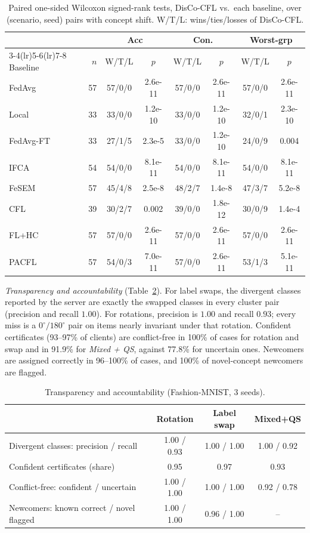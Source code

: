 \documentclass[journal]{IEEEtran}
\theoremstyle{definition}
\begin{document}
\begin{table}[t]
\centering
\caption{Paired one-sided Wilcoxon signed-rank tests, DisCo-CFL vs.\ each baseline, over (scenario, seed) pairs with concept shift. W/T/L: wins/ties/losses of DisCo-CFL.}\label{tab:signif}
\scriptsize\setlength{\tabcolsep}{2.2pt}
\begin{tabular}{lrcccccc}
\toprule
& & \multicolumn{2}{c}{Acc} & \multicolumn{2}{c}{Con.} & \multicolumn{2}{c}{Worst-grp} \\
\cmidrule(lr){3-4}\cmidrule(lr){5-6}\cmidrule(lr){7-8}
Baseline & $n$ & W/T/L & $p$ & W/T/L & $p$ & W/T/L & $p$ \\
\midrule
FedAvg & 57 & 57/0/0 & 2.6e-11 & 57/0/0 & 2.6e-11 & 57/0/0 & 2.6e-11 \\
Local & 33 & 33/0/0 & 1.2e-10 & 33/0/0 & 1.2e-10 & 32/0/1 & 2.3e-10 \\
FedAvg-FT & 33 & 27/1/5 & 2.3e-5 & 33/0/0 & 1.2e-10 & 24/0/9 & 0.004 \\
IFCA & 54 & 54/0/0 & 8.1e-11 & 54/0/0 & 8.1e-11 & 54/0/0 & 8.1e-11 \\
FeSEM & 57 & 45/4/8 & 2.5e-8 & 48/2/7 & 1.4e-8 & 47/3/7 & 5.2e-8 \\
CFL & 39 & 30/2/7 & 0.002 & 39/0/0 & 1.8e-12 & 30/0/9 & 1.4e-4 \\
FL+HC & 57 & 57/0/0 & 2.6e-11 & 57/0/0 & 2.6e-11 & 57/0/0 & 2.6e-11 \\
PACFL & 57 & 54/0/3 & 7.0e-11 & 57/0/0 & 2.6e-11 & 53/1/3 & 5.1e-11 \\
\bottomrule
\end{tabular}
\end{table}

\emph{Transparency and accountability} (Table~\ref{tab:fat}). For label swaps, the divergent classes reported by the server are exactly the swapped classes in every cluster pair (precision and recall $1.00$). For rotations, precision is $1.00$ and recall $0.93$; every miss is a $0^\circ/180^\circ$ pair on items nearly invariant under that rotation. Confident certificates (93--97\% of clients) are conflict-free in 100\% of cases for rotation and swap and in 91.9\% for \emph{Mixed + QS}, against 77.8\% for uncertain ones. Newcomers are assigned correctly in 96--100\% of cases, and 100\% of novel-concept newcomers are flagged.

\begin{table}[t]
\centering
\caption{Transparency and accountability (Fashion-MNIST, 3 seeds).}\label{tab:fat}
\scriptsize\setlength{\tabcolsep}{3pt}
\begin{tabular}{lccc}
\toprule
& Rotation & Label swap & Mixed+QS \\
\midrule
Divergent classes: precision / recall & 1.00 / 0.93 & 1.00 / 1.00 & 1.00 / 0.92 \\
Confident certificates (share) & 0.95 & 0.97 & 0.93 \\
Conflict-free: confident / uncertain & 1.00 / 1.00 & 1.00 / 1.00 & 0.92 / 0.78 \\
Newcomers: known correct / novel flagged & 1.00 / 1.00 & 0.96 / 1.00 & -- \\
\bottomrule
\end{tabular}
\end{table}
\end{document}
